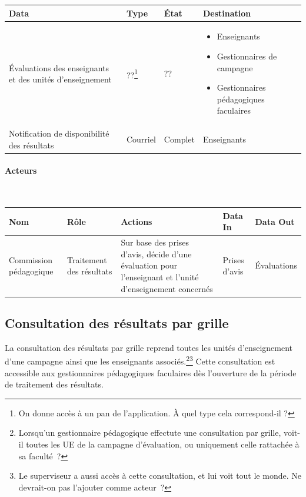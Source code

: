 \documentclass[a4paper,11pt]{report}
\begin{document}
\begin{tabularx}{\linewidth}{|X|X|X|X|} \hline
Data & Type & État & Destination \\ \hline
Évaluations des enseignants et des unités d'enseignement & ??\footnote{On donne accès à un pan de l'application. À quel type cela correspond-il ?} & ?? & 
\begin{itemize}
	\item Enseignants
	\item Gestionnaires de campagne
	\item Gestionnaires pédagogiques faculaires\newline{}
\end{itemize}
\\
Notification de disponibilité des résultats & Courriel & Complet & Enseignants \\ \hline
\end{tabularx}

\paragraph{Acteurs}~\newline{}

\begin{tabularx}{\linewidth}{|X|X|X|X|X|} \hline
Nom & Rôle & Actions & Data In & Data Out \\ \hline 
Commission pédagogique & Traitement des résultats & Sur base des prises d'avis, décide d'une évaluation pour l'enseignant et l'unité d'enseignement concernés & Prises d'avis & Évaluations \\ \hline
\end{tabularx}






\subsection{Consultation des résultats par grille}
La consultation des résultats par grille reprend toutes les unités d'enseignement  d'une campagne ainsi que les enseignants associés.\footnote{Lorsqu'un gestionnaire pédagogique effectute une consultation par grille, voit-il toutes les UE de la campagne d'évaluation, ou uniquement celle rattachée à sa faculté~?}\footnote{Le superviseur a aussi accès à cette consultation, et lui voit tout le monde. Ne devrait-on pas l'ajouter comme acteur~?}
Cette consultation est accessible aux gestionnaires pédagogiques faculaires dès l'ouverture de la période de traitement des résultats.
\end{document}
